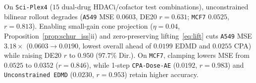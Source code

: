 \documentclass[journal]{IEEEtran}
\begin{document}
On \texttt{Sci-\allowbreak Plex4} ($15$ dual-drug HDACi/cofactor test combinations), unconstrained bilinear rollout degrades (\texttt{A549} MSE $0.0603$, DE20 $r=0.631$; \texttt{MCF7} $0.0525$, $r=0.813$). Enabling small-gain cone projection ($\eta = 0.04$, Proposition~\ref{prop:schur_iss}ii) and zero-preserving lifting~\eqref{eq:lift} cuts \texttt{A549} MSE \textbf{$3.18\times$} ($0.0603 \to \mathbf{0.0190}$, lowest overall ahead of $0.0199$ EDMD and $0.0255$ CPA) while raising DE20 $r$ to $0.950$ ($97.7\%$ Dir.). On \texttt{MCF7}, clamping lowers MSE from $0.0525$ to $0.0352$ ($r=0.846$), while 1-step \texttt{CPA-\allowbreak Dose-\allowbreak AE} ($0.0192$, $r=0.983$) and \texttt{Unconstrained EDMD} ($0.0230$, $r=0.953$) retain higher accuracy.


\end{document}
